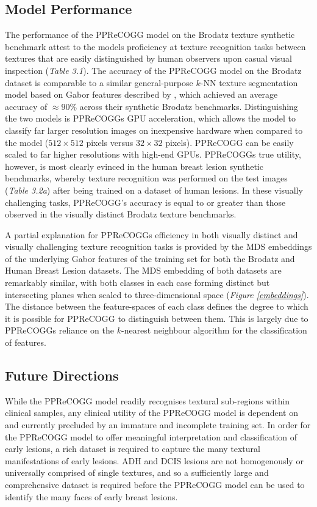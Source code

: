 \subsection{Model Performance}
The performance of the PPReCOGG model on the Brodatz texture synthetic benchmark attest to the models proficiency at texture recognition tasks between textures that are easily distinguished by human observers upon casual visual inspection (\textit{Table 3.1}). The accuracy of the PPReCOGG model on the Brodatz dataset is comparable to a similar general-purpose $k$-NN texture segmentation model based on Gabor features described by \cite{melendez2008}, which achieved an average accuracy of $\approx90\%$ across their synthetic Brodatz benchmarks. Distinguishing the two models is PPReCOGGs GPU acceleration, which allows the model to classify far larger resolution images on inexpensive hardware when compared to the \citeauthor{melendez2008} model ($512\times512$ pixels versus $32\times32$ pixels). PPReCOGG can be easily scaled to far higher resolutions with high-end GPUs. PPReCOGGs true utility, however, is most clearly evinced in the human breast lesion synthetic benchmarks, whereby texture recognition was performed on the test images (\textit{Table 3.2a}) after being trained on a dataset of human lesions. In these visually challenging tasks, PPReCOGG's accuracy is equal to or greater than those observed in the visually distinct Brodatz texture benchmarks.\par

A partial explanation for PPReCOGGs efficiency in both visually distinct and visually challenging texture recognition tasks is provided by the MDS embeddings of the underlying Gabor features of the training set for both the Brodatz and Human Breast Lesion datasets. The MDS embedding of both datasets are remarkably similar, with both classes in each case forming distinct but intersecting planes when scaled to three-dimensional space (\textit{Figure \ref{embeddings}}). The distance between the feature-spaces of each class defines the degree to which it is possible for PPReCOGG to distinguish between them. This is largely due to PPReCOGGs reliance on the $k$-nearest neighbour algorithm for the classification of features.\par

\subsection{Future Directions}
While the PPReCOGG model readily recognises textural sub-regions within clinical samples, any clinical utility of the PPReCOGG model is dependent on and currently precluded by an immature and incomplete training set. In order for the PPReCOGG model to offer meaningful interpretation and classification of early lesions, a rich dataset is required to capture the many textural manifestations of early lesions. ADH and DCIS lesions are not homogenously or universally comprised of single textures, and so a sufficiently large and comprehensive dataset is required before the PPReCOGG model can be used to identify the many faces of early breast lesions. \par

